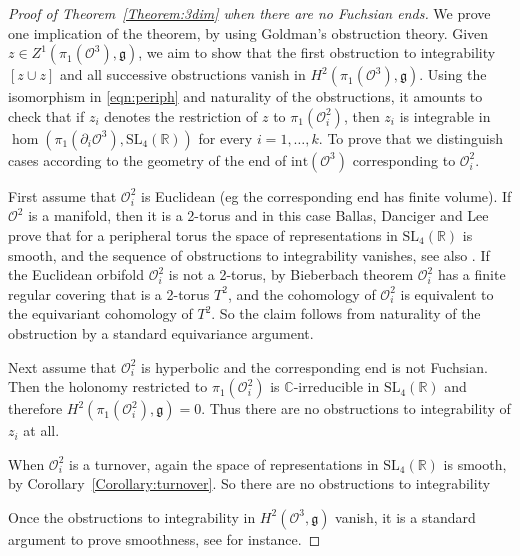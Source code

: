 \documentclass[a4paper,11pt]{article}
\begin{document}
\begin{proof}[Proof of Theorem~\ref{Theorem:3dim}
when there are no Fuchsian ends]

We prove one implication of the theorem, by using 
Goldman's obstruction theory. Given $z\in Z^1(\pi_1(\mathcal O^3),\mathfrak g)$,
we aim to show that the first obstruction to integrability $[z\cup z]$ and all successive obstructions 
vanish in $  H^2(\pi_1(\mathcal O^3),\mathfrak g)$. Using the isomorphism in \eqref{eqn:periph}
and naturality of the obstructions, it amounts to check that if $z_i$ denotes the restriction
of $z$ to $\pi_1(\mathcal O^2_i)$, then $z_i$ is integrable in 
$\hom(\pi_1(\partial_i\mathcal O^3), 
\mathrm{SL}_4(\mathbb R)
)$ for every $i=1,\ldots ,k$. To prove that 
we distinguish cases according to the geometry of the end of $\mathrm{int}(\mathcal O^3)$ corresponding to
$\mathcal O^2_i$.

First assume that $\mathcal O^2_i$ is Euclidean (eg the corresponding end has finite volume). If $\mathcal O^2$ is a
manifold, then it is a 2-torus and in this case \cite[Lemma~3.4]{BDL} Ballas, Danciger and Lee prove that for a peripheral torus 
the space of representations in $\mathrm{SL}_4(\mathbb R)$ is smooth, 
and the sequence of obstructions to integrability vanishes, see also
\cite[Proof of Theorem~3.2]{BDL}. If the Euclidean  orbifold
$\mathcal O^2_i$ is not a 2-torus, by Bieberbach theorem 
$\mathcal O^2_i$ has a finite regular covering that is a 2-torus $T^2$, and the cohomology of $\mathcal O^2_i$
is equivalent to the equivariant cohomology of $T^2$. So the claim follows  from naturality of the obstruction by a standard 
equivariance argument.


Next assume that $\mathcal O^2_i$ is hyperbolic and the corresponding end is not Fuchsian. Then the holonomy restricted
to $\pi_1(\mathcal O^2_i)$ is $\mathbb C$-irreducible in $\mathrm{SL}_4(\mathbb R)$ and therefore 
$H^2(\pi_1(\mathcal O^2_i),\mathfrak g)=0$. Thus there are no obstructions to integrability of $z_i$  at all. 

When $\mathcal O^2_i$ is a turnover, again the space of representations in $\mathrm{SL}_4(\mathbb R)$ is smooth, 
by Corollary~\ref{Corollary:turnover}. So there are no obstructions to integrability

Once the obstructions to integrability in 
$H^2(\mathcal O^3,\mathfrak g)$ vanish, it is a standard argument to prove smoothness, see \cite{Goldman,HPS} 
for instance.
 \end{proof}
% 
% 
% 
% 
% 
\end{document}
